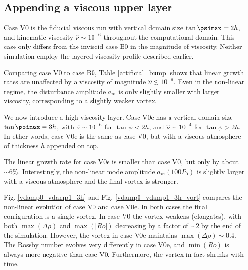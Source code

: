 \subsection{Appending a viscous upper layer}
Case V0 is the fiducial viscous run with vertical domain size $\tan{\psimax}=2h$, and
kinematic viscosity $\hat{\nu}\sim10^{-6}$ throughout the
computational domain. This case only differs from the inviscid case B0
in the magnitude of viscosity. Neither simulation employ the
layered viscosity profile described earlier. 

Comparing case V0 to case B0, Table \ref{artificial_bump} shows that
linear growth rates are unaffected by a viscosity of magnitude
$\hat{\nu}\lesssim10^{-6}$. Even in the non-linear regime, the 
disturbance amplitude $a_m$ is only slightly smaller with larger
viscosity, corresponding to a slightly weaker vortex. 

We now introduce a high-viscosity layer. Case V0e has a vertical
domain size $\tan{\psimax}=3h$, with $\hat{\nu}\sim 10^{-6}$ for
$\tan{\psi} < 2h$, and $\hat{\nu}\sim10^{-4}$ for $\tan{\psi}>2h$. In
other words, case V0e is the same as case V0, but with a viscous
atmosphere of thickness $h$ appended on top.  

The linear growth rate for case V0e is smaller than case V0, but only
by about $\sim 6\%$. 
Interestingly, the non-linear mode amplitude $a_m(100P_0)$ is
slightly larger with a viscous atmosphere and the final vortex is
stronger. 

Fig. \ref{vdamp0_vdamp1_3h} and Fig. \ref{vdamp0_vdamp1_3h_vort}
compares the non-linear evolution of case V0 and case V0e. In both
cases the final configuration is a single vortex. In case V0
the vortex weakens (elongates), with both $\max(\Delta\rho)$ and
$\max(|Ro|)$ decreasing by a factor of $\sim2$ by the end of the
simulation. However, the vortex in case V0e maintains
$\max(\Delta\rho)\sim 0.4$. The Rossby number evolves very differently
in case V0e, and $\min(Ro)$ is always more negative than case
V0. Furthermore, the vortex in fact shrinks with time. 


